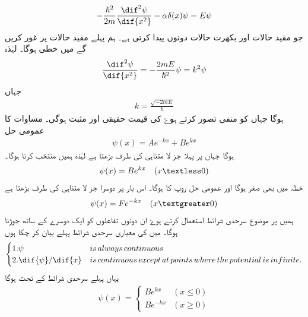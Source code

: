 \begin{align}
-\frac{\hslash^{2}}{2m}\frac{\dif^{2}\psi}{\dif{x^{2}}}-\alpha\delta(x)\psi=E\psi
\end{align} 
جو مقید حالات   اور بکھرت حالات   دونوں پیدا کرتی ہے۔ ہم پہلے مقید حالات پر غور کریں گے   میں خطی   ہوگا۔ لہٰذہ 
\begin{align}
\frac{\dif^{2}\psi}{\dif{x^{2}}}=-\frac{2mE}{\hslash^{2}}\psi=k^{2}\psi
\end{align}
جہاں
\begin{align}
k=\frac{\sqrt{-2mE}}{\hslash}
\end{align}
ہوگا جہاں  کو منفی تصور کرتے ہوۓ   کی قیمت حقیقی اور مثبت ہوگی۔  مساوات  کا عمومی حل 
\begin{align}
\psi(x)=Ae^{-kx}+Be^{kx}
\end{align}
ہوگا جہاں   پر پہلا جز لا متناہی کی طرف بڑھتا ہے لہٰذہ ہمیں               منتخب کرنا ہوگا۔ 
\begin{align}
\psi(x)=Be^{kx}\quad (x\textless0)
\end{align}
خطہ   میں بھی  صفر ہوگا اور عمومی حل   روپ کا ہوگا۔ اس بار  پر دوسرا جز لا متناہی کی طرف بڑھتا ہے 
\begin{align}
\psi(x)=Fe^{-kx}\quad (x\textgreater0)
\end{align}
 ہمیں    پر موضوع سرحدی شرائط استعمال کرتے ہوۓ ان دونوں تفاعلوں کو ایک دوسرے کے ساتھ جوڑنا ہوگا۔ میں      کی معیاری سرحدی شرائط پہلے بیان کر چکا ہوں
\begin{align}
\begin{cases}
1. \psi & is\, always\, continuous\\
2. \dif{\psi}/\dif{x} & is\,continuous\,except\,at\,points\,where\,the\,potential\,is\,infinite.
\end{cases}
\end{align}
 یہاں پہلے سرحدی شرائط کے تحت   ہوگا 
\begin{align}
\psi(x)=
\begin{cases}
Be^{kx}&(x\le0)\\
Be^{-kx}&(x\ge0)
\end{cases}
\end{align} 
